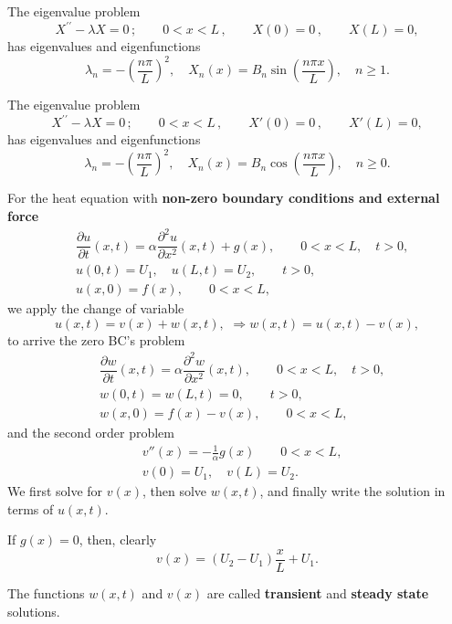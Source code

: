 \documentclass[11pt]{article}
\begin{document}
\begin{preamble}
\begin{formulaitem}

\item The eigenvalue problem
\begin{equation*}
X^{\prime \prime} - \lambda X =0\,; \qquad  0<x<L \,, \qquad X(0)=0  \,,\qquad X(L) =0,
\end{equation*}
has eigenvalues and eigenfunctions
\[\lambda_{n}=-\left( \frac{n\pi}{L}\right)^{2}, \quad X_{n}(x)=B_{n}\sin\left( \frac{n\pi x}{L} \right), \quad  n\geq 1.\]


\item The eigenvalue problem
\begin{equation*}
X^{\prime \prime} - \lambda X =0\,; \qquad  0<x<L \,, \qquad X'(0)=0  \,,\qquad X'(L) =0,
\end{equation*}
has eigenvalues and eigenfunctions
\[\lambda_{n}=-\left( \frac{n\pi}{L}\right)^{2}, \quad X_{n}(x)=B_{n}\cos\left( \frac{n\pi x}{L} \right), \quad  n\geq 0.\]

\item For the heat equation with \textbf{non-zero boundary conditions and external force}
\begin{equation*} \begin{split}
& \dfrac{\partial u }{\partial t } (x,t) = \alpha\dfrac{\partial^2 u}{\partial x^2}(x,t) + g(x), \qquad 0<x<L, \quad t>0, \\
& u(0,t) = U_{1}, \quad u(L,t)= U_{2}, \qquad t>0, \\
& u(x,0) = f(x), \qquad 0<x<L,
\end{split}\end{equation*}
we apply the change of variable
\[u(x,t)=v(x)+w(x,t), \,\, \Rightarrow w(x,t)=u(x, t)-v(x),\]
to arrive the zero BC's problem
\begin{equation*} \begin{split}
& \dfrac{\partial w }{\partial t } (x,t) = \alpha\dfrac{\partial^2 w}{\partial x^2}(x,t), \qquad 0<x<L, \quad t>0, \\
& w(0,t) = w(L,t)= 0, \qquad t>0, \\
& w(x,0) = f(x) - v(x), \qquad 0<x<L,
\end{split}\end{equation*}
and the second order problem
\begin{equation*} \begin{split}
& v''(x) = -\tfrac{1}{\alpha}g(x) \qquad 0<x<L, \\
& v(0) = U_{1}, \quad v(L)= U_{2}.
\end{split}\end{equation*}
We first solve for $v(x)$, then solve $w(x,t)$, and finally write the solution in terms of $u(x,t)$.

If $g(x)=0$, then, clearly
\[v(x)=(U_{2}-U_{1})\frac{x}{L}+U_{1}.\]

The functions $w(x, t)$ and $v(x)$ are called \textbf{transient} and \textbf{steady state} solutions.

\end{formulaitem}
\end{preamble}
\end{document}
